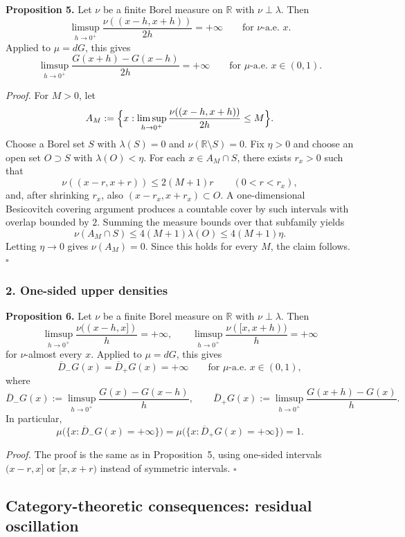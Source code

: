 \noindent\textbf{Proposition 5.}
Let $\nu$ be a finite Borel measure on $\mathbb R$ with $\nu\perp\lambda$. Then
\[
\limsup_{h\to0^+}\frac{\nu((x-h,x+h))}{2h}=+\infty
\qquad\text{for }\nu\text{-a.e. }x.
\]
Applied to $\mu=dG$, this gives
\[
\limsup_{h\to0^+}\frac{G(x+h)-G(x-h)}{2h}=+\infty
\qquad\text{for }\mu\text{-a.e. }x\in(0,1).
\]

\medskip
\noindent\textit{Proof.}
For $M>0$, let
\[
A_M:=\Bigl\{x:\limsup_{h\to0^+}\frac{\nu((x-h,x+h))}{2h}\le M\Bigr\}.
\]
Choose a Borel set $S$ with $\lambda(S)=0$ and $\nu(\mathbb R\setminus S)=0$. Fix $\eta>0$ and choose an open set $O\supset S$ with $\lambda(O)<\eta$. For each $x\in A_M\cap S$, there exists $r_x>0$ such that
\[
\nu((x-r,x+r))\le 2(M+1)r\qquad(0<r<r_x),
\]
and, after shrinking $r_x$, also $(x-r_x,x+r_x)\subset O$. A one-dimensional Besicovitch covering argument produces a countable cover by such intervals with overlap bounded by $2$. Summing the measure bounds over that subfamily yields
\[
\nu(A_M\cap S)\le 4(M+1)\lambda(O)\le 4(M+1)\eta.
\]
Letting $\eta\to0$ gives $\nu(A_M)=0$. Since this holds for every $M$, the claim follows. \hfill$\square$

\subsubsection*{2. One-sided upper densities}

\noindent\textbf{Proposition 6.}
Let $\nu$ be a finite Borel measure on $\mathbb R$ with $\nu\perp\lambda$. Then
\[
\limsup_{h\to0^+}\frac{\nu((x-h,x])}{h}=+\infty,
\qquad
\limsup_{h\to0^+}\frac{\nu([x,x+h))}{h}=+\infty
\]
for $\nu$-almost every $x$.
Applied to $\mu=dG$, this gives
\[
\overline D_-G(x)=\overline D_+G(x)=+\infty
\qquad\text{for }\mu\text{-a.e. }x\in(0,1),
\]
where
\[
\overline D_-G(x):=\limsup_{h\to0^+}\frac{G(x)-G(x-h)}{h},
\qquad
\overline D_+G(x):=\limsup_{h\to0^+}\frac{G(x+h)-G(x)}{h}.
\]
In particular,
\[
\mu\bigl(\{x:\overline D_-G(x)=+\infty\}\bigr)=
\mu\bigl(\{x:\overline D_+G(x)=+\infty\}\bigr)=1.
\]

\medskip
\noindent\textit{Proof.}
The proof is the same as in Proposition~5, using one-sided intervals $(x-r,x]$ or $[x,x+r)$ instead of symmetric intervals. \hfill$\square$

\subsection{Category-theoretic consequences: residual oscillation}

